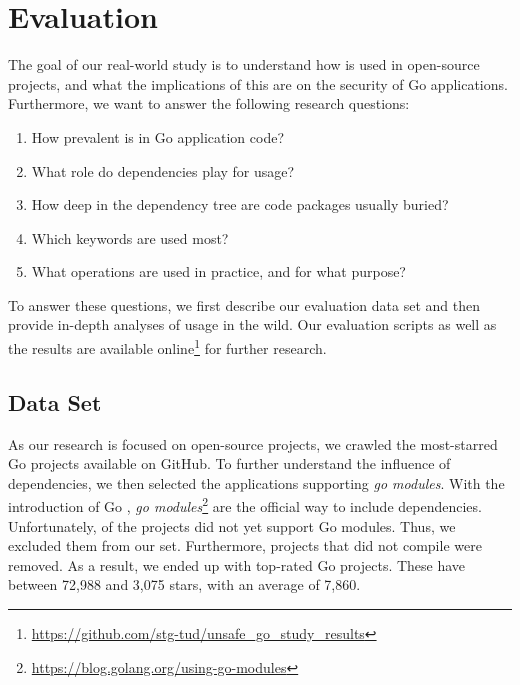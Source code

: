 \section{Evaluation}
\label{sec:eval}

The goal of our real-world study is to understand how \unsafe{} is used in open-source projects, and what the implications of this are on the security of Go applications. 
Furthermore, we want to answer the following research questions:

\begin{enumerate}[leftmargin=*,label={RQ\arabic*}]
    \item How prevalent is \unsafe{} in Go application code? \label{rq:prevalApp}
    \item What role do dependencies play for \unsafe{} usage? \label{rq:prevalDeps}
    \item How deep in the dependency tree are \unsafe{} code packages usually buried? \label{rq:depsDepth}
    \item Which \unsafe{} keywords are used most? \label{rq:distTypes}
    \item What \unsafe{} operations are used in practice, and for what purpose? \label{rq:purpose}
\end{enumerate}

%

To answer these questions, we first describe our evaluation data set and then provide in-depth analyses of \unsafe{} usage in the wild.
Our evaluation scripts as well as the results are available online\footnote{\url{https://github.com/stg-tud/unsafe_go_study_results}} for further research.





\subsection{Data Set}

As our research is focused on open-source projects, we crawled the \initalProjs{} most-starred Go projects available on GitHub. 
To further understand the influence of dependencies, we then selected the applications supporting \textit{go modules}.
With the introduction of Go , \textit{go modules}\footnote{\url{https://blog.golang.org/using-go-modules}} are the official way to include dependencies.
Unfortunately, \withoutModules{} of the projects did not yet support Go modules.
Thus, we excluded them from our set.
Furthermore, \notCompiled{} projects that did not compile were removed.
As a result, we ended up with \projsAnalyzed{} top-rated Go projects. %
These have between 72,988 and 3,075 stars, with an average of 7,860. %


